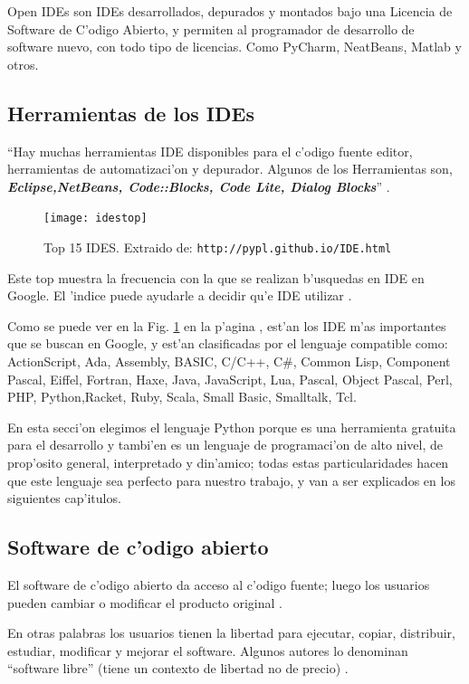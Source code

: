 Open IDEs  son IDEs desarrollados, depurados y montados bajo una Licencia de Software de C'odigo Abierto, y permiten al programador de desarrollo de software nuevo, con todo tipo de licencias. Como PyCharm, NeatBeans, Matlab y otros.

\subsection{Herramientas de los IDEs }

``Hay muchas herramientas IDE disponibles para el c'odigo fuente
editor, herramientas de automatizaci'on y depurador. Algunos de los
Herramientas son, \textbf{\textsl{Eclipse,NetBeans, Code::Blocks, Code Lite, Dialog Blocks}}'' \citep{Ainternational}.
\begin{figure}[ht]
	\centering
		\texttt{[image: idestop]}
	\caption{Top 15 IDES. \smallskip Extraido de: \texttt{{http://pypl.github.io/IDE.html}}}
	\label{fig:idestop}
\end{figure}

Este top muestra la frecuencia con la que se realizan b'usquedas en IDE en Google. El 'indice puede ayudarle a decidir qu'e IDE utilizar \citep{pierre}. 

Como se puede ver en la Fig. \ref{fig:idestop} en la p'agina \pageref{fig:idestop}, est'an los IDE m'as importantes que se buscan en Google, y est'an  clasificadas por el lenguaje compatible como: ActionScript,	Ada,	Assembly,	BASIC,	C/C++,	C\#,	Common Lisp,	Component Pascal,	Eiffel,	Fortran, Haxe,	Java,	JavaScript,	Lua,	Pascal, Object Pascal,	Perl,	PHP,	Python,Racket,	Ruby,	Scala,	Small Basic,	Smalltalk,	Tcl.

En esta secci'on elegimos el lenguaje Python porque es una herramienta gratuita para el desarrollo y tambi'en es un lenguaje de programaci'on de alto nivel, de prop'osito general, interpretado y din'amico; todas estas particularidades hacen que este lenguaje sea perfecto para nuestro trabajo, y van a ser explicados en los siguientes cap'itulos.


\subsection{Software de c'odigo abierto}

El software de c'odigo abierto da acceso al c'odigo fuente; luego los usuarios pueden cambiar o modificar el producto original \citep{melissa}.

En otras palabras los usuarios tienen la libertad para ejecutar, copiar, distribuir, estudiar,
modificar y mejorar el software. Algunos autores lo
denominan ``software libre'' (tiene un contexto de libertad no de precio) \citep{anrango}. 

